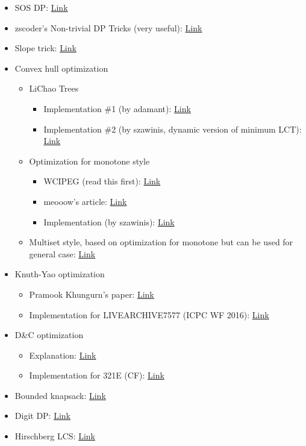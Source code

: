 \begin{itemize}
\item SOS DP: \href{https://codeforces.com/blog/entry/45223}{Link}
\item zscoder's Non-trivial DP Tricks (very useful): \href{https://codeforces.com/blog/entry/47764}{Link}
\item Slope trick: \href{https://codeforces.com/blog/entry/47821}{Link}
\item Convex hull optimization
\begin{itemize}
\item LiChao Trees
\begin{itemize}
\item Implementation \#1 (by adamant): \href{https://cp-algorithms.com/geometry/convex\_hull\_trick.html}{Link}
\item Implementation \#2 (by szawinis, dynamic version of minimum LCT): \href{https://codeforces.com/contest/932/submission/51400890}{Link}
\end{itemize}
\item Optimization for monotone style
\begin{itemize}
\item WCIPEG (read this first): \href{https://wcipeg.com/wiki/Convex\_hull\_trick}{Link}
\item meooow's article: \href{https://codeforces.com/blog/entry/63823}{Link}
\item Implementation (by szawinis): \href{https://codeforces.com/contest/319/submission/25433048}{Link}
\end{itemize}
\item Multiset style, based on optimization for monotone but can be used for general case: \href{https://codeforces.com/contest/319/submission/28792061}{Link}
\end{itemize}
\item Knuth-Yao optimization
\begin{itemize}
\item Pramook Khungurn's paper: \href{https://github.com/programming-in-th/tutorial/blob/master/advanced\_topics/Pramook\_2013\_yao-speedup.pdf}{Link}
\item Implementation for LIVEARCHIVE7577 (ICPC WF 2016): \href{https://github.com/szawinis/CompetitiveProgramming/blob/master/LiveArchive/7577.cpp}{Link}
\end{itemize}
\item D\&C optimization
\begin{itemize}
\item Explanation: \href{https://www.youtube.com/watch?v=wLXEWuDWnzI}{Link}
\item Implementation for 321E (CF): \href{https://codeforces.com/contest/321/submission/25801193}{Link}
\end{itemize}
\item Bounded knapsack: \href{https://codeforces.com/blog/entry/59606}{Link}
\item Digit DP: \href{https://codeforces.com/blog/entry/53960}{Link}
\item Hirschberg LCS: \href{https://codeforces.com/blog/entry/47247}{Link}
\end{itemize}

